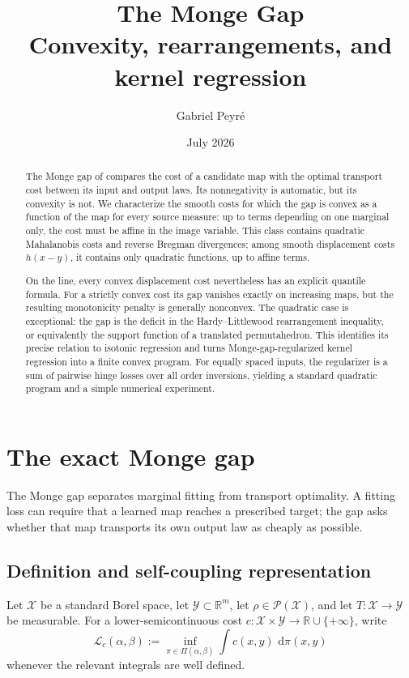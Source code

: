 \documentclass[11pt,a4paper]{article}
\title{The Monge Gap\\
  \large Convexity, rearrangements, and kernel regression}
\author{Gabriel Peyr\'e}
\date{July 2026}
\theoremstyle{definition}
\theoremstyle{remark}
\newcommand{\R}{\mathbb R}
\newcommand{\Pcal}{\mathcal P}
\newcommand{\Lcal}{\mathcal L}
\newcommand{\dd}{\,\mathrm d}
\begin{document}
\maketitle

\begin{abstract}
The Monge gap of \citet{UsciddaCuturi2023} compares the cost of a candidate
map with the optimal transport cost between its input and output laws. Its
nonnegativity is automatic, but its convexity is not. We characterize the
smooth costs for which the gap is convex as a function of the map for every
source measure: up to terms depending on one marginal only, the cost must be
affine in the image variable. This class contains quadratic Mahalanobis costs
and reverse Bregman divergences; among smooth displacement costs
$h(x-y)$, it contains only quadratic functions, up to affine terms.

On the line, every convex displacement cost nevertheless has an explicit
quantile formula. For a strictly convex cost its gap vanishes exactly on
increasing maps, but the resulting monotonicity penalty is generally
nonconvex. The quadratic case is exceptional: the gap is the deficit in the
Hardy--Littlewood rearrangement inequality, or equivalently the support
function of a translated permutahedron. This identifies its precise relation
to isotonic regression and turns Monge-gap-regularized kernel regression into
a finite convex program. For equally spaced inputs, the regularizer is a sum
of pairwise hinge losses over all order inversions, yielding a standard
quadratic program and a simple numerical experiment.
\end{abstract}

\section{The exact Monge gap}

The Monge gap separates marginal fitting from transport optimality. A fitting
loss can require that a learned map reaches a prescribed target; the gap asks
whether that map transports its own output law as cheaply as possible.

\subsection{Definition and self-coupling representation}

Let $\mathcal X$ be a standard Borel space, let $\mathcal Y\subset\R^m$, let
$\rho\in\Pcal(\mathcal X)$, and let $T:\mathcal X\to\mathcal Y$ be
measurable. For a lower-semicontinuous cost
$c:\mathcal X\times\mathcal Y\to\R\cup\{+\infty\}$, write
\[
  \Lcal_c(\alpha,\beta)
  :=\inf_{\pi\in\Pi(\alpha,\beta)}\int c(x,y)\,\dd\pi(x,y)
\]
whenever the relevant integrals are well defined.
\end{document}
